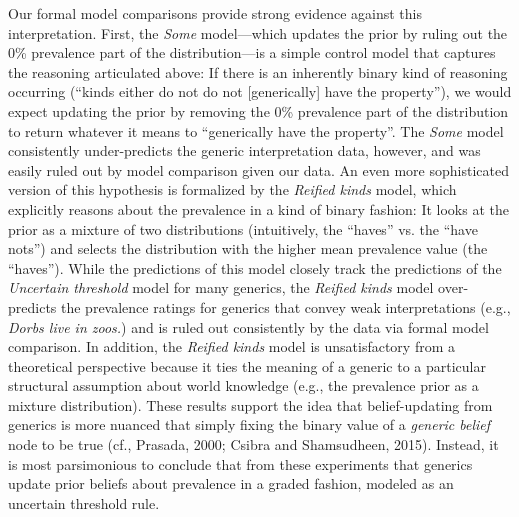 \documentclass[floatsintext,doc]{apa6}
\begin{document}
Our formal model comparisons provide strong evidence against this interpretation.
First, the \emph{Some} model---which updates the prior by ruling out the 0\% prevalence part of the distribution---is a simple control model that captures the reasoning articulated above: If there is an inherently binary kind of reasoning occurring (``kinds either do not do not [generically] have the property''), we would expect updating the prior by removing the 0\% prevalence part of the distribution to return whatever it means to ``generically have the property''. 
The \emph{Some} model consistently under-predicts the generic interpretation data, however, and was easily ruled out by model comparison given our data.
An even more sophisticated version of this hypothesis is formalized by the \emph{Reified kinds} model, which explicitly reasons about the prevalence in a kind of binary fashion: It looks at the prior as a mixture of two distributions (intuitively, the ``haves'' vs. the ``have nots'') and selects the distribution with the higher mean prevalence value (the ``haves'').
While the predictions of this model closely track the predictions of the \emph{Uncertain threshold} model for many generics, the \emph{Reified kinds} model over-predicts the prevalence ratings for generics that convey weak interpretations (e.g., \emph{Dorbs live in zoos.}) and is ruled out consistently by the data via formal model comparison. 
In addition, the \emph{Reified kinds} model is unsatisfactory from a theoretical perspective because it ties the meaning of a generic to a particular structural assumption about world knowledge (e.g., the prevalence prior as a mixture distribution). 
These results support the idea that belief-updating from generics is more nuanced that simply fixing the binary value of a \emph{generic belief} node to be true (cf., Prasada, 2000; Csibra and Shamsudheen, 2015).
Instead, it is most parsimonious to conclude that from these experiments that generics update prior beliefs about prevalence in a graded fashion, modeled as an uncertain threshold rule.
%
%
\end{document}

